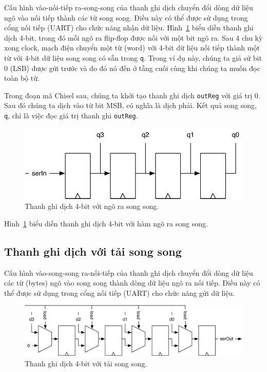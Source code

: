 \documentclass[%
    10pt,
    headinclude, footexclude,
    openright, %
    notitlepage,
    cleardoubleempty,
    headsepline,
    pointlessnumbers,
    bibtotoc, idxtotoc,
    ]{scrbook}
\newcommand{\code}[1]{{\small{\texttt{#1}}}}
\newcommand{\scale}{0.7}
\begin{document}
Cấu hình vào-nối-tiếp ra-song-song của thanh ghi dịch chuyển đổi dòng dữ liệu ngõ vào nối tiếp thành các từ song song. 
Điều này có thể được sử dụng trong cổng nối tiếp (UART) cho chức năng nhận dữ liệu. 
Hình~\ref{fig:shiftreg-paraout} biểu diễn thanh ghi dịch 4-bit, trong đó mỗi ngõ ra flip-flop
được nối với một bit ngõ ra. Sau 4 chu kỳ xong clock, mạch điện chuyển một từ (word) với 4-bit dữ liệu nối tiếp
thành một từ với 4-bit dữ liệu song song có sẵn trong \code{q}. Trong ví dụ này, chúng ta giả sử bit 0
(LSB) được gửi trước và do đó nó đến ở tầng cuối cùng khi chúng ta muốn đọc toàn bộ từ.

Trong đoạn mã Chisel sau, chúng ta khởi tạo thanh ghi dịch \code{outReg} với giá trị 0. Sau đó chúng ta dịch vào từ bit
MSB, có nghĩa là dịch phải. Kết quả song song, \code{q}, chỉ là việc đọc giá trị thanh ghi \code{outReg}.


\begin{figure}
  \centering
  \includegraphics[scale=\scale]{figures/shiftreg-paraout}
  \caption{Thanh ghi dịch 4-bit với ngõ ra song song.}
  \label{fig:shiftreg-paraout}
\end{figure}

\noindent Hình~\ref{fig:shiftreg-paraout} biểu diễn thanh ghi dịch 4-bit với hàm ngõ ra song song.

\subsection{Thanh ghi dịch với tải song song}

Cấu hình vào-song-song ra-nối-tiếp của thanh ghi dịch chuyển đổi dòng dữ liệu các từ (bytes) ngõ vào song song thành dòng dữ liệu ngõ ra nối tiếp. 
Điều này có thể được sử dụng trong cổng nối tiếp (UART) cho chức năng gửi dữ liệu. 

\begin{figure}
  \centering
  \includegraphics[scale=0.6]{figures/shiftreg-paraload}
  \caption{Thanh ghi dịch 4-bit với tải song song.}
  \label{fig:shiftreg-paraload}
\end{figure}
\end{document}
